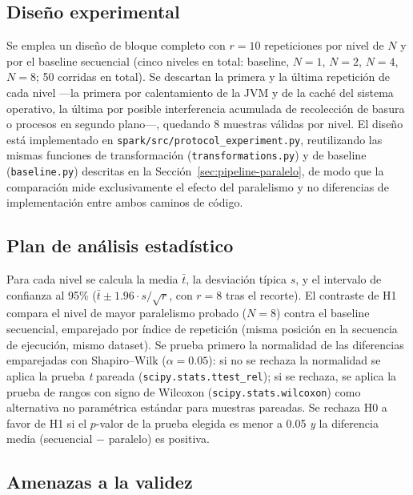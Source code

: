 \subsection{Diseño experimental}

Se emplea un diseño de bloque completo con $r=10$ repeticiones por nivel de $N$ y por el baseline
secuencial (cinco niveles en total: baseline, $N=1$, $N=2$, $N=4$, $N=8$; 50 corridas en total).
Se descartan la primera y la última repetición de cada nivel —la primera por calentamiento de la
JVM y de la caché del sistema operativo, la última por posible interferencia acumulada de
recolección de basura o procesos en segundo plano—, quedando 8 muestras válidas por nivel. El
diseño está implementado en \texttt{spark/src/protocol\_experiment.py}, reutilizando las mismas
funciones de transformación (\texttt{transformations.py}) y de baseline (\texttt{baseline.py})
descritas en la Sección~\ref{sec:pipeline-paralelo}, de modo que la comparación mide exclusivamente
el efecto del paralelismo y no diferencias de implementación entre ambos caminos de código.

\subsection{Plan de análisis estadístico}

Para cada nivel se calcula la media $\bar{t}$, la desviación típica $s$, y el intervalo de
confianza al 95\% ($\bar{t} \pm 1.96 \cdot s/\sqrt{r}$, con $r=8$ tras el recorte). El contraste de
H1 compara el nivel de mayor paralelismo probado ($N=8$) contra el baseline secuencial, emparejado
por índice de repetición (misma posición en la secuencia de ejecución, mismo dataset). Se prueba
primero la normalidad de las diferencias emparejadas con Shapiro--Wilk ($\alpha=0.05$): si no se
rechaza la normalidad se aplica la prueba \emph{t} pareada (\texttt{scipy.stats.ttest\_rel}); si se
rechaza, se aplica la prueba de rangos con signo de Wilcoxon
(\texttt{scipy.stats.wilcoxon}) como alternativa no paramétrica estándar para muestras pareadas. Se
rechaza H0 a favor de H1 si el $p$-valor de la prueba elegida es menor a 0.05 \emph{y} la
diferencia media (secuencial $-$ paralelo) es positiva.

\subsection{Amenazas a la validez}

